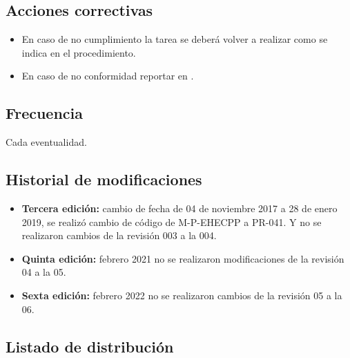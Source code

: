 \subsection{Acciones correctivas}

\begin{itemize}
	\item En caso de no cumplimiento la tarea se deberá volver a realizar como se indica en el procedimiento.
	\item En caso de no conformidad reportar en \RAC.
\end{itemize}

\subsection{Frecuencia}

Cada eventualidad.

\subsection{Historial de modificaciones}

\begin{itemize}
	\item \textbf{Tercera edición:} cambio de fecha de 04 de noviembre 2017 a 28 de enero 2019, se realizó cambio de código de M-P-EHECPP a PR-041. Y no se realizaron cambios de la revisión 003 a la 004.
	\item \textbf{Quinta edición:} febrero 2021 no se realizaron modificaciones de la revisión 04 a la 05.
	\item \textbf{Sexta edición:} febrero 2022 no se realizaron cambios de la revisión 05 a la 06.
\end{itemize}

\subsection{Listado de distribución}


